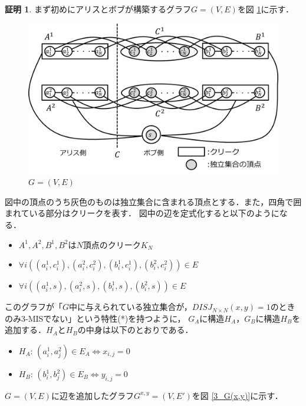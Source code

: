 \documentclass[12pt]{thesis}
\theoremstyle{definition}
\newtheorem*{prf*}{証明}
\begin{document}
\begin{prf*}
まず初めにアリスとボブが構築するグラフ$G = (V, E)$を図 \ref{3_G}に示す．

\begin{figure}[ht]
\begin{center}
\includegraphics[width=120mm]{3_G.png}
\end{center}
\caption{$G = (V, E)$}
\label{3_G}
\end{figure}

図中の頂点のうち灰色のものは独立集合に含まれる頂点とする．また，四角で囲まれている部分はクリークを表す．
図中の辺を定式化すると以下のようになる．
\begin{itemize}
\item $A^{1}, A^{2}, B^{1}, B^{2}$は$N$頂点のクリーク$K_{N}$
\item $\forall i((a_{i}^{1}, c_{i}^{1}), (a_{i}^{2}, c_{i}^{2}), (b_{i}^{1}, c_{i}^{1}), (b_{i}^{2}, c_{i}^{2})) \in E$
\item $\forall i((a_{i}^{1}, s), (a_{i}^{2}, s), (b_{i}^{1}, s), (b_{i}^{2}, s)) \in E$
\end{itemize}

このグラフが「$G$中に与えられている独立集合が，$DISJ_{N \times N} (x, y) = 1$のときのみ3-MISでない」という特性(*)を持つように，
$G_{A}$に構造$H_{A}$，$G_{B}$に構造$H_{B}$を追加する．$H_{A}$と$H_{B}$の中身は以下のとおりである．
\newpage
\begin{itemize}
\item $H_{A}$: $(a_{i}^{1}, a_{j}^{2}) \in E_{A} \Leftrightarrow x_{i, j} = 0$
\item $H_{B}$: $(b_{i}^{1}, b_{j}^{2}) \in E_{B} \Leftrightarrow y_{i, j} = 0$
\end{itemize}

$G = (V, E)$に辺を追加したグラフ$G^{x, y} = (V, E')$を図 \ref{3_G(x,y)}に示す．


\end{prf*}
\end{document}

